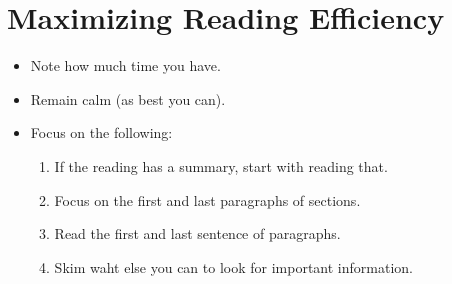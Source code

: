 \section{Maximizing Reading Efficiency}

\begin{itemize}
    \item Note how much time you have.
    \item Remain calm (as best you can).
    \item Focus on the following:
    \begin{enumerate}
        \item If the reading has a summary, start with reading that.
        \item Focus on the first and last paragraphs of sections.
        \item Read the first and last sentence of paragraphs.
        \item Skim waht else you can to look for important information.
    \end{enumerate}
\end{itemize}